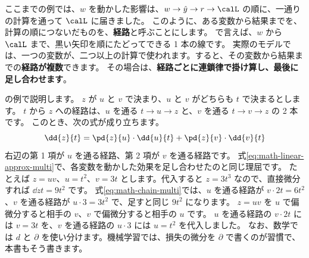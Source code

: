 ここまでの例では、$w$ を動かした影響は、$w\to\hat{y}\to r\to\calL$ の順に、一通りの計算を通って $\calL$ に届きました。
このように、ある変数から結果までを、計算の順につないだものを、\textbf{経路}と呼ぶことにします。
で言えば、$w$ から $\calL$ まで、黒い矢印を順にたどってできる 1 本の線です。
実際のモデルでは、一つの変数が、二つ以上の計算で使われます。すると、その変数から結果までの\textbf{経路が複数}できます。
その場合は、\textbf{経路ごとに連鎖律で掛け算し、最後に足し合わせます}。

の例で説明します。
$z$ が $u$ と $v$ で決まり、$u$ と $v$ がどちらも $t$ で決まるとします。
$t$ から $z$ への経路は、$u$ を通る $t\to u\to z$ と、$v$ を通る $t\to v\to z$ の 2 本です。
このとき、次の式が成り立ちます。
\begin{equation}
\dd{z}{t}=\pd{z}{u}\cdot\dd{u}{t}+\pd{z}{v}\cdot\dd{v}{t}
\label{eq:math-chain-multi}
\end{equation}
右辺の第 1 項が $u$ を通る経路、第 2 項が $v$ を通る経路です。
式\eqref{eq:math-linear-approx-multi}で、各変数を動かした効果を足し合わせたのと同じ理屈です。
たとえば $z=uv$、$u=t^{2}$、$v=3t$ とします。代入すると $z=3t^{3}$ なので、直接微分すれば $\dd{z}{t}=9t^{2}$ です。
式\eqref{eq:math-chain-multi}では、$u$ を通る経路が $v\cdot 2t=6t^{2}$、$v$ を通る経路が $u\cdot 3=3t^{2}$ で、足すと同じ $9t^{2}$ になります。
$z=uv$ を $u$ で偏微分すると相手の $v$、$v$ で偏微分すると相手の $u$ です。
$u$ を通る経路の $v\cdot 2t$ には $v=3t$ を、$v$ を通る経路の $u\cdot 3$ には $u=t^{2}$ を代入しました。
なお、数学では $d$ と $\partial$ を使い分けます。機械学習では、損失の微分を $\partial$ で書くのが習慣で、本書もそう書きます。

